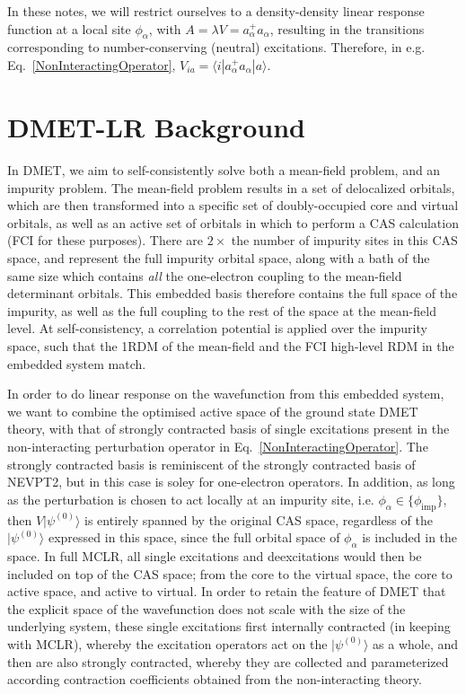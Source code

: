 \documentclass[a4paper,oneside,11pt]{article}
\numberwithin{equation}{section}
\begin{document}
In these notes, we will restrict ourselves to a density-density linear response function at a local site $\phi_{\alpha}$, with $A = \lambda V = a_{\alpha}^{+} a_{\alpha}$, 
resulting in the transitions corresponding to 
number-conserving (neutral) excitations. Therefore, in e.g. Eq.~\ref{NonInteractingOperator}, $V_{ia} = \langle i | a_{\alpha}^{+} a_{\alpha} | a \rangle$.

\section{DMET-LR Background}

In DMET, we aim to self-consistently solve both a mean-field problem, and an impurity problem. The mean-field problem results in a set of delocalized orbitals, which are then transformed into a specific
set of doubly-occupied core and virtual orbitals, as well as an active set of orbitals in which to perform a CAS calculation (FCI for these purposes). There are $2 \times$ the number of impurity sites in
this CAS space, and represent the full impurity orbital space, along with a bath of the same size which contains {\em all} the one-electron coupling to the mean-field determinant orbitals. 
This embedded basis therefore
contains the full space of the impurity, as well as the full coupling to the rest of the space at the mean-field level. At self-consistency, a correlation potential is applied over the impurity space,
such that the 1RDM of the mean-field and the FCI high-level RDM in the embedded system match.

In order to do linear response on the wavefunction from this embedded system, we want to combine the optimised active space of the ground state DMET theory, with that of strongly contracted basis of single
excitations present in the non-interacting perturbation operator in Eq.~\ref{NonInteractingOperator}. The strongly contracted basis is reminiscent of the strongly contracted basis of NEVPT2, but in this
case is soley for one-electron operators. In addition, as long as the perturbation is chosen to act locally at an impurity site, i.e. $\phi_{\alpha} \in \{\phi_{\textrm{imp}}\}$, 
then $V |\psi^{(0)} \rangle$ is entirely spanned by the original CAS space, regardless of the $|\psi^{(0)} \rangle$ expressed in this space, since the full orbital space of $\phi_{\alpha}$ is 
included in the space. In full MCLR, all single excitations and deexcitations would then be included on top of the CAS space; from the core to the virtual space, the core to active space, and active to virtual.
In order to retain the feature of DMET that the explicit space of the wavefunction does not scale with the size of the underlying system, these single excitations first internally contracted (in keeping
with MCLR), whereby the excitation operators act on the $|\psi^{(0)} \rangle$ as a whole, and then are also strongly contracted, whereby they are collected and parameterized according contraction
coefficients obtained from the non-interacting theory.
\end{document}
